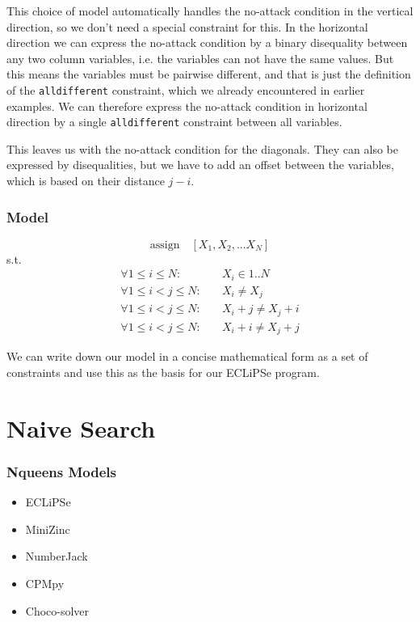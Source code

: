 This choice of model automatically handles the no-attack condition in the vertical direction, so we don't need a special constraint for this. In the horizontal direction we can express the no-attack condition by a binary disequality between any two column variables, i.e. the variables can not have the same values. But this means the variables must be pairwise different, and that is just the definition of the \texttt{alldifferent} constraint, which we already encountered in earlier examples. We can therefore express the no-attack condition in horizontal direction by a single \texttt{alldifferent} constraint between all variables.

This leaves us with the no-attack condition for the diagonals. They can also be expressed by disequalities, but we have to add an offset between the variables, which is based on their distance $j-i$. 

\begin{frame}
\frametitle{Model}
\[
\textrm{assign}\quad [X_1,X_2,...X_N]
\]
s.t.
\begin{align*}
\forall 1 \leq i \leq N:&\quad X_i \in 1..N\\
\forall 1 \leq i<j \leq N:&\quad X_i \neq X_j\\
\forall 1 \leq i<j \leq N:&\quad X_i +j\neq X_j+i\\
\forall 1 \leq i<j \leq N:&\quad X_i +i\neq X_j+j
\end{align*}
\end{frame}

We can write down our model in a concise mathematical form as a set of constraints and use this as the basis for our ECLiPSe program.


\section{Naive Search}

\begin{frame}
\frametitle{Nqueens Models}
\begin{itemize}
\item ECLiPSe \hyperlink{nqueens:eclipse}{}
\item MiniZinc \hyperlink{nqueens:minizinc}{}
\item NumberJack \hyperlink{nqueens:numberjack}{}
\item CPMpy \hyperlink{nqueens:cpmpy}{}
\item Choco-solver \hyperlink{nqueens:choco}{}
\end{itemize}
\end{frame}

